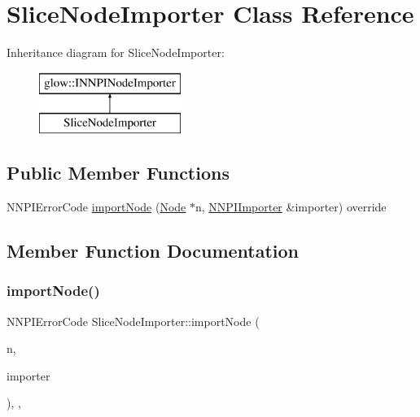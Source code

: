 \hypertarget{class_slice_node_importer}{}\section{Slice\+Node\+Importer Class Reference}
\label{class_slice_node_importer}
Inheritance diagram for Slice\+Node\+Importer\+:\begin{figure}[H]
\begin{center}
\leavevmode
\includegraphics[height=2.000000cm]{class_slice_node_importer}
\end{center}
\end{figure}
\subsection*{Public Member Functions}
\begin{DoxyCompactItemize}
\item 
N\+N\+P\+I\+Error\+Code \hyperlink{class_slice_node_importer_a0dcbbfd5fc43eb9dd8e009e909edcfd9}{import\+Node} (\hyperlink{classglow_1_1_node}{Node} $\ast$n, \hyperlink{classglow_1_1_n_n_p_i_importer}{N\+N\+P\+I\+Importer} \&importer) override
\end{DoxyCompactItemize}


\subsection{Member Function Documentation}
\mbox{\label{class_slice_node_importer_a0dcbbfd5fc43eb9dd8e009e909edcfd9}} 
\subsubsection{\texorpdfstring{import\+Node()}{importNode()}}
{\footnotesize\ttfamily N\+N\+P\+I\+Error\+Code Slice\+Node\+Importer\+::import\+Node (\begin{DoxyParamCaption}\item[{\hyperlink{classglow_1_1_node}{Node} $\ast$}]{n,  }\item[{\hyperlink{classglow_1_1_n_n_p_i_importer}{N\+N\+P\+I\+Importer} \&}]{importer }\end{DoxyParamCaption})\hspace{0.3cm}{\ttfamily [inline]}, {\ttfamily [override]}, {\ttfamily [virtual]}}

